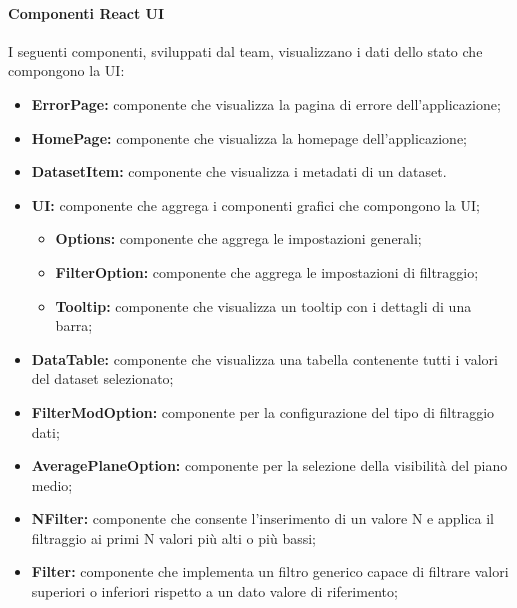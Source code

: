 \paragraph{Componenti React UI}
    I seguenti componenti, sviluppati dal team, visualizzano i dati dello stato che compongono la UI:
    \begin{itemize}
        \item \textbf{ErrorPage:} componente che visualizza la pagina di errore dell'applicazione;
        \item \textbf{HomePage:} componente che visualizza la homepage dell'applicazione;
        \item \textbf{DatasetItem:} componente che visualizza i metadati di un dataset.
        \item \textbf{UI:} componente che aggrega i componenti grafici che compongono la UI;
            \begin{itemize}
                \item \textbf{Options:} componente che aggrega le impostazioni generali;
                \item \textbf{FilterOption:} componente che aggrega le impostazioni di filtraggio;
                \item \textbf{Tooltip:} componente che visualizza un tooltip con i dettagli di una barra;
            \end{itemize}
        \item \textbf{DataTable:} componente che visualizza una tabella contenente tutti i valori del dataset selezionato;
        \item \textbf{FilterModOption:} componente per la configurazione del tipo di filtraggio dati;
        \item \textbf{AveragePlaneOption:} componente per la selezione della visibilità del piano medio;
        \item \textbf{NFilter:} componente che consente l'inserimento di un valore N e applica il filtraggio ai primi N valori più alti o più bassi;
        \item \textbf{Filter:} componente che implementa un filtro generico capace di filtrare valori superiori o inferiori rispetto a un dato valore di riferimento;
    \end{itemize}
